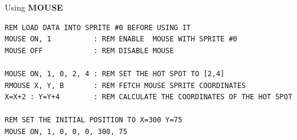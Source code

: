 \begin{description}[leftmargin=2cm,style=nextline]
\item [Examples:] Using {\bf MOUSE}

\begin{tcolorbox}[colback=black,coltext=white]
\verbatimfont{\codefont}
\begin{verbatim}
REM LOAD DATA INTO SPRITE #0 BEFORE USING IT
MOUSE ON, 1          : REM ENABLE  MOUSE WITH SPRITE #0
MOUSE OFF            : REM DISABLE MOUSE

MOUSE ON, 1, 0, 2, 4 : REM SET THE HOT SPOT TO [2,4]
RMOUSE X, Y, B       : REM FETCH MOUSE SPRITE COORDINATES
X=X+2 : Y=Y+4        : REM CALCULATE THE COORDINATES OF THE HOT SPOT

REM SET THE INITIAL POSITION TO X=300 Y=75
MOUSE ON, 1, 0, 0, 0, 300, 75
\end{verbatim}
\end{tcolorbox}
\end{description}


\newpage
